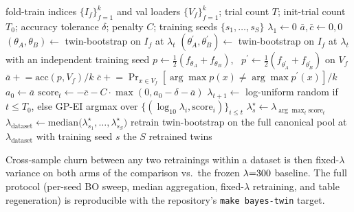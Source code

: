 \begin{algorithm}[H]
  \caption{Per-dataset BO of $\lambda$ with cross-sample-churn
           objective.  Stage~1 (the outer \textbf{for}-loop over $s$)
           runs once per (dataset, training seed) and returns
           $\lambda^\star_s$; stage~2 (the two trailing lines)
           takes the median across seeds and retrains.}
  \label{alg:bayes_twin_bo}
  \begin{algorithmic}[1]
    \Require fold-train indices $\{I_f\}_{f=1}^{k}$ and val loaders
             $\{V_f\}_{f=1}^{k}$; trial count $T$;
             init-trial count $T_0$;
             accuracy tolerance $\delta$; penalty $C$;
             training seeds $\{s_1, \dots, s_S\}$
      \State $\lambda_1 \gets 0$ 
        \State $\bar a, \bar c \gets 0, 0$
          \State $(\theta_A, \theta_B) \gets$ twin-bootstrap on $I_f$ at $\lambda_t$
          \State $(\theta_A^\prime, \theta_B^\prime) \gets$ twin-bootstrap on $I_f$ at $\lambda_t$
                 with an independent training seed
          \State $p \gets \tfrac{1}{2}(f_{\theta_A} + f_{\theta_B})$,
                 \, $p^\prime \gets \tfrac{1}{2}(f_{\theta_A^\prime} + f_{\theta_B^\prime})$
                 on $V_f$
          \State $\bar a \mathrel{+}= \text{acc}(p, V_f) / k$
          \State $\bar c \mathrel{+}= \Pr_{x \in V_f}[\arg\max p(x) \neq \arg\max p^\prime(x)] / k$
        \EndFor
         $a_0 \gets \bar a$ \EndIf
        \State $\text{score}_t \gets -\bar c - C \cdot \max(0, a_0 - \delta - \bar a)$
        \State $\lambda_{t+1} \gets$ log-uniform random if $t \leq T_0$, else GP-EI argmax over
               $\{(\log_{10}\lambda_i, \text{score}_i)\}_{i \leq t}$
      \EndFor
      \State $\lambda^\star_s \gets \lambda_{\arg\max_t \text{score}_t}$
    \EndFor
    \State $\lambda_{\text{dataset}} \gets \mathrm{median}\bigl(\lambda^\star_{s_1}, \dots, \lambda^\star_{s_S}\bigr)$
      \State retrain twin-bootstrap on the full canonical pool at $\lambda_{\text{dataset}}$
             with training seed $s$
    \EndFor
    \State \Return the $S$ retrained twins
  \end{algorithmic}
\end{algorithm}

Cross-sample churn between any two retrainings within a dataset is
then fixed-$\lambda$ variance on both arms of the comparison vs.\
the frozen $\lambda{=}300$ baseline.  The full protocol
(per-seed BO sweep, median aggregation, fixed-$\lambda$ retraining,
and table regeneration) is reproducible with the repository's
\texttt{make bayes-twin} target.

